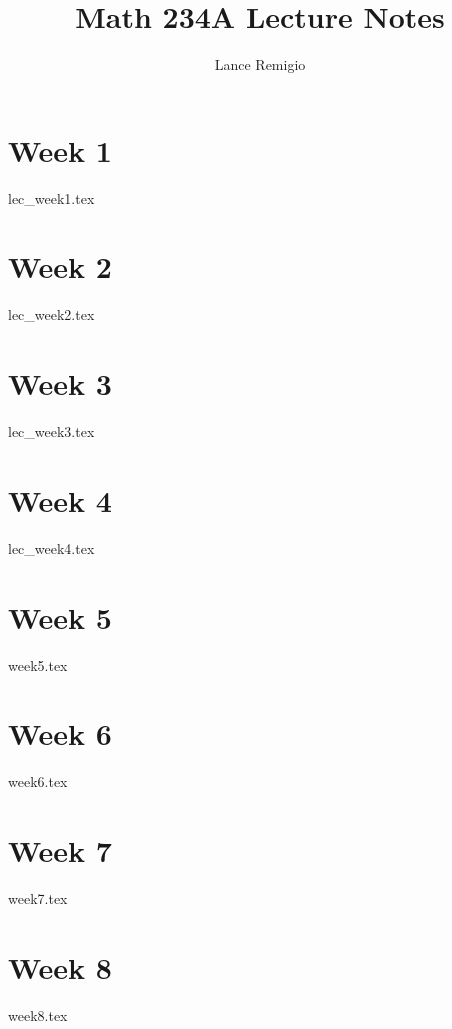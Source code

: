 \documentclass[a4paper]{report}
\title{Math 234A Lecture Notes}
\author{Lance Remigio}
\begin{document}
\maketitle    
\tableofcontents

\chapter{Week 1}

{lec_week1.tex}

\chapter{Week 2}

{lec_week2.tex}

\chapter{Week 3}

{lec_week3.tex}

\chapter{Week 4}

{lec_week4.tex}

\chapter{Week 5}

{week5.tex}

\chapter{Week 6}

{week6.tex}

\chapter{Week 7}

{week7.tex}

\chapter{Week 8}

{week8.tex}
\end{document}
